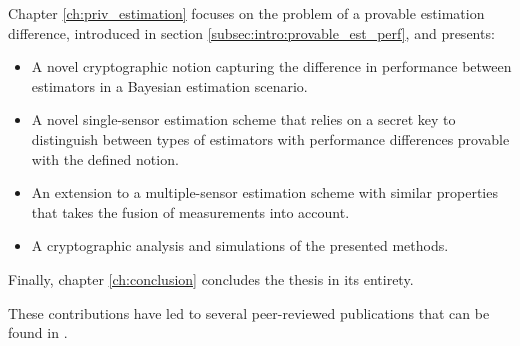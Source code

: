 Chapter \ref{ch:priv_estimation} focuses on the problem of a provable estimation difference, introduced in section \ref{subsec:intro:provable_est_perf}, and presents:
\begin{itemize}
    \item A novel cryptographic notion capturing the difference in performance between estimators in a Bayesian estimation scenario.
    \item A novel single-sensor estimation scheme that relies on a secret key to distinguish between types of estimators with performance differences provable with the defined notion.
    \item An extension to a multiple-sensor estimation scheme with similar properties that takes the fusion of measurements into account.
    \item A cryptographic analysis and simulations of the presented methods.
\end{itemize}

Finally, chapter \ref{ch:conclusion} concludes the thesis in its entirety.

These contributions have led to several peer-reviewed publications that can be found in .